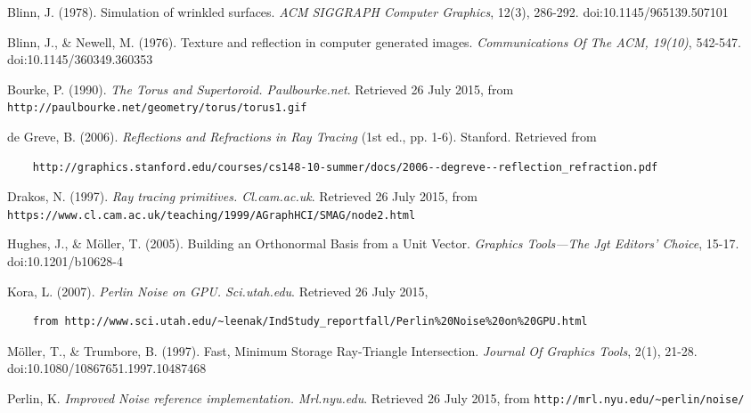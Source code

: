 
\begin{thebibliography}{13}
  Blinn, J. (1978). Simulation of wrinkled surfaces. \textit{ACM SIGGRAPH 
  Computer Graphics}, 12(3), 286-292. doi:10.1145/965139.507101
  
  Blinn, J., \& Newell, M. (1976). Texture and reflection in computer generated images. 
  \textit{Communications Of The ACM, 19(10)}, 542-547. doi:10.1145/360349.360353
  
  Bourke, P. (1990). \textit{The Torus and Supertoroid. Paulbourke.net}. 
  Retrieved 26 July 2015, from \verb|http://paulbourke.net/geometry/torus/torus1.gif|
  
  de Greve, B. (2006). \textit{Reflections and Refractions in Ray Tracing} (1st ed., pp. 1-6).
  Stanford. Retrieved from 
  \begin{lstlisting}
    http://graphics.stanford.edu/courses/cs148-10-summer/docs/2006--degreve--reflection_refraction.pdf
  \end{lstlisting}
  
  Drakos, N. (1997). \textit{Ray tracing primitives. Cl.cam.ac.uk}. Retrieved 26 July 2015, 
  from \verb|https://www.cl.cam.ac.uk/teaching/1999/AGraphHCI/SMAG/node2.html|
  
  Hughes, J., \& Möller, T. (2005). Building an Orthonormal Basis from a Unit Vector. 
  \textit{Graphics Tools---The Jgt Editors' Choice}, 15-17. doi:10.1201/b10628-4
  
  Kora, L. (2007). \textit{Perlin Noise on GPU. Sci.utah.edu}. Retrieved 26 July 2015, 
  \begin{lstlisting}
    from http://www.sci.utah.edu/~leenak/IndStudy_reportfall/Perlin%20Noise%20on%20GPU.html
  \end{lstlisting}
  
  Möller, T., \& Trumbore, B. (1997). Fast, Minimum Storage Ray-Triangle Intersection. 
  \textit{Journal Of Graphics Tools}, 2(1), 21-28. doi:10.1080/10867651.1997.10487468
  
  Perlin, K. \textit{Improved Noise reference implementation. Mrl.nyu.edu}. Retrieved 26 July 2015, 
  from \verb|http://mrl.nyu.edu/~perlin/noise/|
  

\end{thebibliography}
